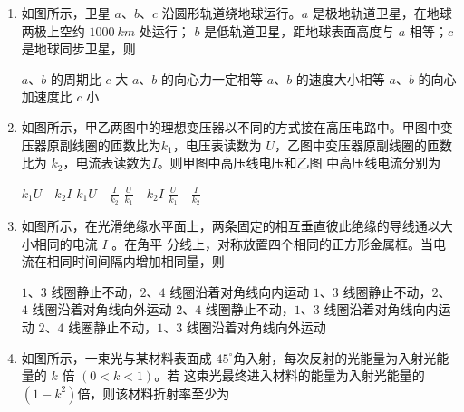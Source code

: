 \begin{enumerate}
\item
如图所示，卫星 $ a $、$ b $、$ c $ 沿圆形轨道绕地球运行。$ a $ 是极地轨道卫星，在地球两极上空约 $ 1000 \ km $ 处运行；
$ b $ 是低轨道卫星，距地球表面高度与 $ a $ 相等；$ c $ 是地球同步卫星，则  
\begin{figure}[h!]
\centering

\end{figure}


\fourchoices
{$ a $、$ b $ 的周期比 $ c $ 大}
{$ a $、$ b $ 的向心力一定相等}
{$ a $、$ b $ 的速度大小相等}
{$ a $、$ b $ 的向心加速度比 $ c $ 小}


\item
如图所示，甲乙两图中的理想变压器以不同的方式接在高压电路中。甲图中变压器原副线圈的匝数比为$ k_{1} $，电压表读数为 $ U $，乙图中变压器原副线圈的匝数比为 $ k_{2} $，电流表读数为$ I $。则甲图中高压线电压和乙图
中高压线电流分别为  
\begin{figure}[h!]
\centering

\end{figure}

\fourchoices
{$k_{1} U \quad k_{2} I$}
{$ k_{1} U \quad \frac{I}{k_{2}}$}
{$\frac{U}{k_{1}} \quad k_{2} I$}
{$\frac{U}{k_{1}} \quad \frac{I}{k_{2}}$}


\item
如图所示，在光滑绝缘水平面上，两条固定的相互垂直彼此绝缘的导线通以大小相同的电流 $ I $ 。在角平
分线上，对称放置四个相同的正方形金属框。当电流在相同时间间隔内增加相同量，则  
\begin{figure}[h!]
\centering

\end{figure}


\fourchoices
{$ 1 $、$ 3 $ 线圈静止不动，$ 2 $、$ 4 $ 线圈沿着对角线向内运动}
{$ 1 $、$ 3 $ 线圈静止不动，$ 2 $、$ 4 $ 线圈沿着对角线向外运动}
{$ 2 $、$ 4 $ 线圈静止不动，$ 1 $、$ 3 $ 线圈沿着对角线向内运动}
{$ 2 $、$ 4 $ 线圈静止不动，$ 1 $、$ 3 $ 线圈沿着对角线向外运动}


\newpage
\item
如图所示，一束光与某材料表面成 $ 45 ^{ \circ } $角入射，每次反射的光能量为入射光能量的 $ k $ 倍 $ (0<k<1) $。若
这束光最终进入材料的能量为入射光能量的 $ (1-k^{2}) $倍，则该材料折射率至少为  
\begin{figure}[h!]
\centering

\end{figure}


\end{enumerate}
